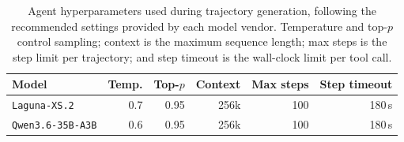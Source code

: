 \begin{table}[h]
\centering
\footnotesize
\caption{Agent hyperparameters used during trajectory generation, following the recommended settings provided by each model vendor. Temperature and top-$p$ control sampling; context is the maximum sequence length; max steps is the step limit per trajectory; and step timeout is the wall-clock limit per tool call.}
\label{tab:agent_hparams}
\begin{tabular}{lrrrrr}
\toprule
Model & Temp. & Top-$p$ & Context & Max steps & Step timeout \\
\midrule
\texttt{Laguna-XS.2} & 0.7 & 0.95 & 256k & 100 & 180\,s \\
\texttt{Qwen3.6-35B-A3B} & 0.6 & 0.95 & 256k & 100 & 180\,s \\
\bottomrule
\end{tabular}
\end{table}